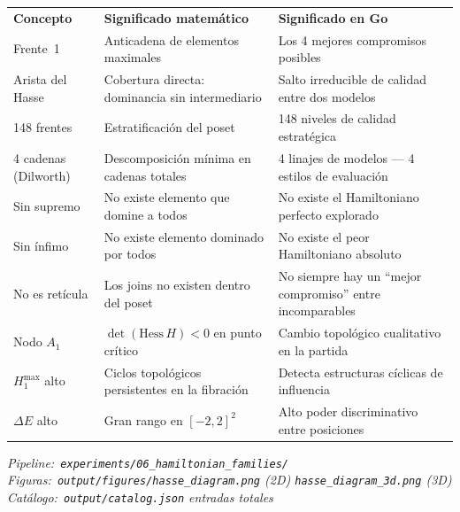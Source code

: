 \documentclass[11pt, a4paper]{article}
\newcommand{\TH}[1]{\cellcolor{cTHbg}\color{white}\textbf{#1}}
\begin{document}
\medskip
\begin{center}
\begin{tabularx}{0.96\textwidth}{L{3cm}L{4.4cm}X}
  \TH{Concepto} & \TH{Significado matem\'atico} & \TH{Significado en Go} \\[1pt]
  Frente~1
    & Anticadena de elementos maximales
    & Los 4 mejores compromisos posibles \\
  Arista del Hasse
    & Cobertura directa: dominancia sin intermediario
    & Salto irreducible de calidad entre dos modelos \\
  148 frentes
    & Estratificaci\'on del poset
    & 148 niveles de calidad estrat\'egica \\
  4 cadenas (Dilworth)
    & Descomposici\'on m\'inima en cadenas totales
    & 4 linajes de modelos --- 4 estilos de evaluaci\'on \\
  Sin supremo
    & No existe elemento que domine a todos
    & No existe el Hamiltoniano perfecto explorado \\
  Sin \'infimo
    & No existe elemento dominado por todos
    & No existe el peor Hamiltoniano absoluto \\
  No es ret\'icula
    & Los joins no existen dentro del poset
    & No siempre hay un ``mejor compromiso'' entre incomparables \\
  Nodo $A_1$
    & $\det(\mathrm{Hess}\,H)<0$ en punto cr\'itico
    & Cambio topol\'ogico cualitativo en la partida \\
  $H_1^{\max}$ alto
    & Ciclos topol\'ogicos persistentes en la fibraci\'on
    & Detecta estructuras c\'iclicas de influencia \\
  $\Delta E$ alto
    & Gran rango en $[-2,2]^2$
    & Alto poder discriminativo entre posiciones \\
\end{tabularx}
\end{center}

\vfill
{}\vspace{4pt}
{\color{cMuted}\small\itshape
  Pipeline:~\texttt{experiments/06\_hamiltonian\_families/}
  \quad\textbullet\quad
  Figuras:~\texttt{output/figures/hasse\_diagram.png} (2D)
  \;\textbullet\; \texttt{hasse\_diagram\_3d.png} (3D)\\
  Cat\'alogo:~\texttt{output/catalog.json}
  \enspace\textbullet{} entradas totales
}
\end{document}
